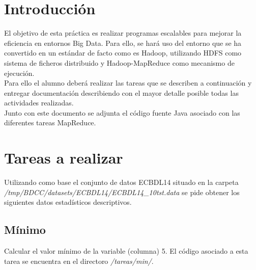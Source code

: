 	
\setcounter{page}{0}



\thispagestyle{empty}

\newpage %

\tableofcontents %


\newpage


\section{Introducción}

El objetivo de esta práctica es realizar programas escalables para mejorar la eficiencia en entornos Big Data. Para ello, se hará uso del entorno que se ha convertido en un estándar de facto como es Hadoop, utilizando HDFS como sistema de ficheros distribuido y Hadoop-MapReduce como mecanismo de ejecución. \\

Para ello el alumno deberá realizar las tareas que se describen a continuación y entregar documentación describiendo con el mayor detalle posible todas las actividades realizadas. \\

Junto con este documento se adjunta el código fuente Java asociado con las diferentes tareas MapReduce. \\


\section{Tareas a realizar}

Utilizando como base el conjunto de datos ECBDL14 situado en la carpeta \textit{/tmp/BDCC/datasets/ECBDL14/ECBDL14\_10tst.data} se pide obtener los siguientes datos estadísticos descriptivos.

\subsection{Mínimo}

Calcular el valor mínimo de la variable (columna) 5. El código asociado a esta tarea se encuentra en el directoro \textit{/tareas/min/}. \\

